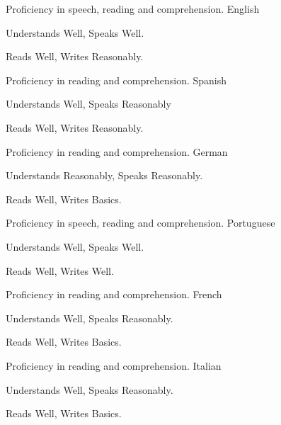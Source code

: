 \noindent
\vspace{-0.3cm}
\begin{multicols}{2}
\begin{cventries}
\noindent

\cventry
        {Proficiency in speech, reading and comprehension.}
        {English}{}{}
        {
         \begin{cvitems}
           \item {Understands Well, Speaks Well.}
           \item {Reads Well, Writes Reasonably.}
          \end{cvitems}
        }

\cventry
        {Proficiency in reading and comprehension.}
        {Spanish}{}{}
        {
         \begin{cvitems}
           \item {Understands Well, Speaks Reasonably}
           \item {Reads Well, Writes Reasonably.}
          \end{cvitems}
        }

\cventry
        {Proficiency in reading and comprehension.}
        {German}{}{}
        {
         \begin{cvitems}
           \item {Understands Reasonably, Speaks Reasonably.}
           \item {Reads Well, Writes Basics.}
          \end{cvitems}
        }
\end{cventries}
\columnbreak
\begin{cventries}
\noindent

\cventry
      {Proficiency in speech, reading and comprehension.}
      {Portuguese}{}{}
      {
       \begin{cvitems}
         \item {Understands Well, Speaks Well.}
         \item {Reads Well, Writes Well.}
        \end{cvitems}
      }

\cventry
      {Proficiency in reading and comprehension.}
      {French}{}{}
      {
       \begin{cvitems}
         \item {Understands Well, Speaks Reasonably.}
         \item {Reads Well, Writes Basics.}
        \end{cvitems}
      }

\cventry
      {Proficiency in reading and comprehension.}
      {Italian}{}{}
      {
       \begin{cvitems}
         \item {Understands Well, Speaks Reasonably.}
         \item {Reads Well, Writes Basics.}
        \end{cvitems}
      }
\end{cventries}
\end{multicols}
